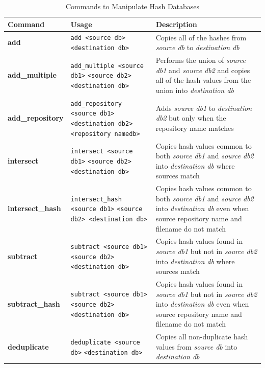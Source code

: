 \documentclass[11pt,fleqn]{article} %
\begin{document}
\begin{table}[!ht]
\centering
\caption{Commands to Manipulate Hash Databases}
\label{tab:databaseManipulation}
\begin{tabular}{|p{3.5 cm}|p{6 cm}|p{4 cm}|}
\hline \hline
\textbf{Command} & \textbf{Usage} & \textbf{Description} \\
\hline
\textbf{add} & \verb+add <source db>+ \verb+<destination db>+ & Copies all of the hashes from \textit{source db} to \textit{destination db}\\
\hline
\textbf{add\_multiple} &  \verb+add_multiple <source db1>+ \verb+<source db2> <destination db>+ & Performs the union of \textit{source db1} and \textit{source db2} and copies all of the hash values from the union into \textit{destination db}\\
\hline
\textbf{add\_repository} & \verb+add_repository <source db1>+ \verb+<destination db2>+ \verb+<repository namedb>+ & Adds \textit{source db1} to \textit{destination db2} but only when the repository name matches\\
\hline
\textbf{intersect} & \verb+intersect <source db1>+ \verb+<source db2> <destination db>+ &   Copies hash values common to both \textit{source db1} and \textit{source db2} into \textit{destination db} where sources match\\
\hline
\textbf{intersect\_hash} & \verb+intersect_hash <source db1>+ \verb+<source db2> <destination db>+ &   Copies hash values common to both \textit{source db1} and \textit{source db2} into \textit{destination db} even when source repository name and filename do not match\\
\hline
\textbf{subtract} & \verb+subtract <source db1>+ \verb+<source db2> <destination db>+&   Copies hash values found in \textit{source db1} but not in \textit{source db2} into \textit{destination db} where sources match\\
\hline
\textbf{subtract\_hash} & \verb+subtract <source db1>+ \verb+<source db2> <destination db>+&   Copies hash values found in \textit{source db1} but not in \textit{source db2} into \textit{destination db} even when source repository name and filename do not match\\
\hline
\textbf{deduplicate} & \verb+deduplicate <source db>+ \verb+<destination db>+ &   Copies all non-duplicate hash values from \textit{source db} into \textit{destination db}\\
\hline
\end{tabular}
\end{table}
\end{document}
